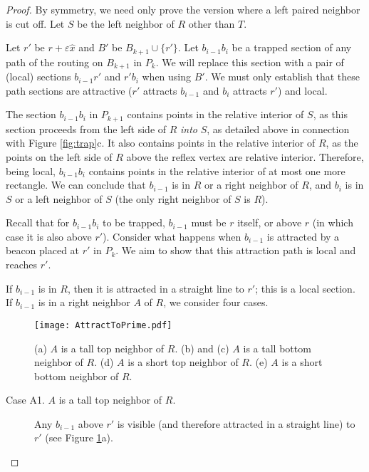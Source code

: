 \documentclass{article}
\begin{document}
	\begin{proof}
		By symmetry, we need only prove the version where a left paired neighbor is cut
		off.  Let $S$ be the left neighbor of $R$ other than $T$.
		
		Let $r'$ be $r + \varepsilon\hat{x}$ and $B'$ be $B_{k+1} \cup \{ r' \}$.
		Let $b_{i-1}b_i$ be a trapped section of any path of the routing on $B_{k+1}$
		in $P_k$.
		We will replace this section with a pair of (local) sections $b_{i-1}r'$ and
		$r'b_{i}$ when using $B'$.
		We must only establish that these path sections are attractive ($r'$ attracts
		$b_{i-1}$ and $b_i$ attracts $r'$) and local.
		
		The section $b_{i-1}b_i$ in $P_{k+1}$ contains points in the relative interior
		of $S$, as this section proceeds from the left side of $R$ \emph{into} $S$,
		as detailed above in connection with Figure \ref{fig:trap}c.
		It also contains points in the relative interior of $R$, as the points on
		the left side of $R$ above the reflex vertex are relative interior.
		Therefore, being local, $b_{i-1}b_i$ contains points in the relative interior
		of at most one more rectangle.
		We can conclude that $b_{i-1}$ is in $R$ or a right neighbor of $R$,
		and $b_i$ is in $S$ or a left neighbor of $S$ (the only right neighbor of $S$
		is $R$).
		
		Recall that for $b_{i-1}b_i$ to be trapped, $b_{i-1}$ must be $r$ itself, or
		above $r$ (in which case it is also above $r'$).
		Consider what happens when $b_{i-1}$ is attracted by a beacon placed at $r'$
		in $P_k$.  We aim to show that this attraction path is local and reaches
		$r'$.
		
		If $b_{i-1}$ is in $R$, then it is attracted in a straight
		line to $r'$; this is a local section.
		If $b_{i-1}$ is in a right neighbor $A$ of $R$, we consider four cases.
		
		\begin{figure}[p] 
		   \begin{center}
		      \texttt{[image: AttractToPrime.pdf]} 
		   \end{center}
		   \caption{
		     (a) $A$ is a tall top neighbor of $R$. 
		     (b) and (c) $A$ is a tall bottom neighbor of $R$.
		     (d) $A$ is a short top neighbor of $R$.
		     (e) $A$ is a short bottom neighbor of $R$.
		   }
		   \label{fig:attracttoprime}
		\end{figure}
		
		\begin{description}
		\item[Case A1.  $A$ is a tall top neighbor of $R$.]
			Any $b_{i-1}$ above $r'$ is visible
			(and therefore attracted in a straight line) to $r'$ (see Figure
			\ref{fig:attracttoprime}a).
		

\end{description}
\end{proof}
\end{document}
